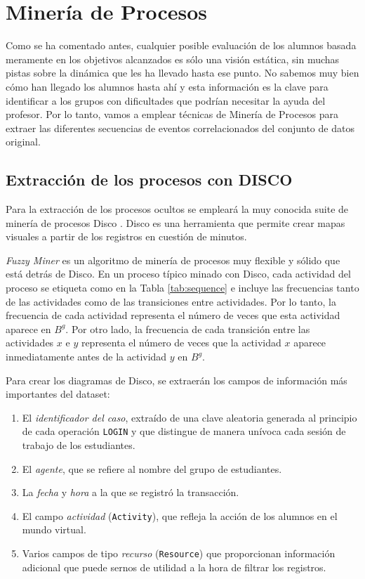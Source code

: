 \chapter{Minería de Procesos}\label{sec:chapterIII}

Como se ha comentado antes, cualquier posible evaluación de los alumnos basada meramente en los objetivos alcanzados es sólo una visión estática, sin muchas pistas sobre la dinámica que les ha llevado hasta ese punto. No sabemos muy bien cómo han llegado los alumnos hasta ahí y esta información es la clave para identificar a los grupos con dificultades que podrían necesitar la ayuda del profesor. Por lo tanto, vamos a emplear técnicas de Minería de Procesos \cite{aalst2016} para extraer las diferentes secuencias de eventos correlacionados del conjunto de datos original.

\section{Extracción de los procesos con DISCO}

Para la extracción de los procesos ocultos se empleará la muy conocida suite de minería de procesos Disco \cite{gunther2012disco}. Disco es una herramienta que permite crear mapas visuales a partir de los registros en cuestión de minutos.

\emph{Fuzzy Miner} \cite{gunther2007fuzzy} es un algoritmo de minería de procesos muy flexible y sólido que está detrás de Disco. En un proceso típico minado con Disco, cada actividad del proceso se etiqueta como en la Tabla \ref{tab:sequence} e incluye las frecuencias tanto de las actividades como de las transiciones entre actividades. Por lo tanto, la frecuencia de cada actividad representa el número de veces que esta actividad aparece en $B^g$. Por otro lado, la frecuencia de cada transición entre las actividades $x$ e $y$ representa el número de veces que la actividad $x$ aparece inmediatamente antes de la actividad $y$ en $B^g$.

Para crear los diagramas de Disco, se extraerán los campos de información más importantes del dataset:
\begin{enumerate}
\item El \emph{identificador del caso}, extraído de una clave aleatoria generada al principio de cada operación \texttt{LOGIN} y que distingue de manera unívoca cada sesión de trabajo de los estudiantes.
\item El \emph{agente}, que se refiere al nombre del grupo de estudiantes.
\item La \emph{fecha} y \emph{hora} a la que se registró la transacción.
\item El campo \emph{actividad} (\texttt{Activity}), que refleja la acción de los alumnos en el mundo virtual.
\item Varios campos de tipo \emph{recurso} (\texttt{Resource}) que proporcionan información adicional que puede sernos de utilidad a la hora de filtrar los registros.
\end{enumerate}

